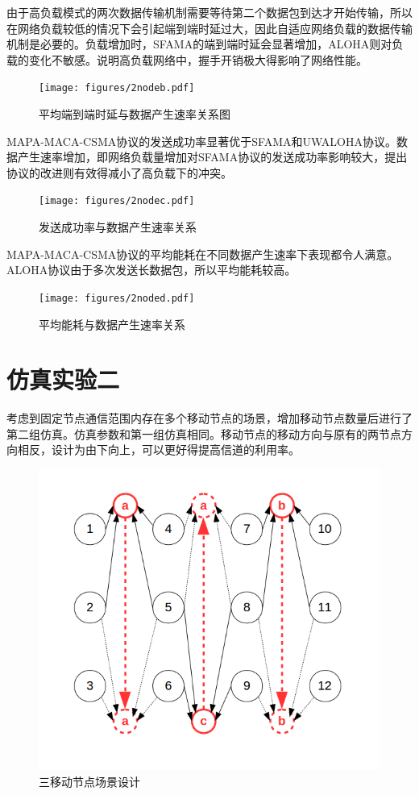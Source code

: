 由于高负载模式的两次数据传输机制需要等待第二个数据包到达才开始传输，所以在网络负载较低的情况下会引起端到端时延过大，因此自适应网络负载的数据传输机制是必要的。负载增加时，SFAMA的端到端时延会显著增加，ALOHA则对负载的变化不敏感。说明高负载网络中，握手开销极大得影响了网络性能。
\begin{figure}[!ht]
	\centering
	\texttt{[image: figures/2nodeb.pdf]}
	\caption{
		平均端到端时延与数据产生速率关系图
	}
	\label{fig:example}
\end{figure}

MAPA-MACA-CSMA协议的发送成功率显著优于SFAMA和UWALOHA协议。数据产生速率增加，即网络负载量增加对SFAMA协议的发送成功率影响较大，提出协议的改进则有效得减小了高负载下的冲突。
\begin{figure}[!ht]
	\centering
	\texttt{[image: figures/2nodec.pdf]}
	\caption{
		发送成功率与数据产生速率关系
	}
	\label{fig:example}
\end{figure}

MAPA-MACA-CSMA协议的平均能耗在不同数据产生速率下表现都令人满意。ALOHA协议由于多次发送长数据包，所以平均能耗较高。

\begin{figure}[!ht]
	\centering
	\texttt{[image: figures/2noded.pdf]}
	\caption{
		平均能耗与数据产生速率关系
	}
	\label{fig:example}
\end{figure}

\section {仿真实验二}
考虑到固定节点通信范围内存在多个移动节点的场景，增加移动节点数量后进行了第二组仿真。仿真参数和第一组仿真相同。移动节点的移动方向与原有的两节点方向相反，设计为由下向上，可以更好得提高信道的利用率。
\begin{figure}[!ht]
	\centering
	\includegraphics[scale=0.5]{figures/3scen.png}
	\caption{
		三移动节点场景设计
	}
	\label{fig:example}
\end{figure}

